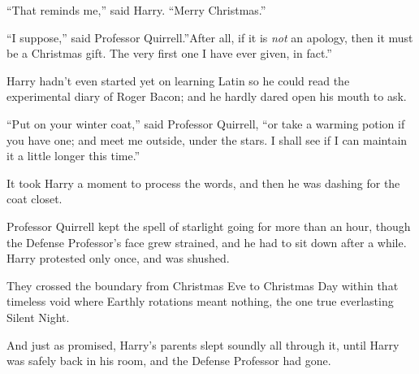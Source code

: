 ``That reminds me,'' said Harry. ``Merry Christmas.''

``I suppose,'' said Professor Quirrell.''After all, if it is \emph{not}
an apology, then it must be a Christmas gift. The very first one I have
ever given, in fact.''

Harry hadn't even started yet on learning Latin so he could read the
experimental diary of Roger Bacon; and he hardly dared open his mouth to
ask.

``Put on your winter coat,'' said Professor Quirrell, ``or take a
warming potion if you have one; and meet me outside, under the stars. I
shall see if I can maintain it a little longer this time.''

It took Harry a moment to process the words, and then he was dashing for
the coat closet.

Professor Quirrell kept the spell of starlight going for more than an
hour, though the Defense Professor's face grew strained, and he had to
sit down after a while. Harry protested only once, and was shushed.

They crossed the boundary from Christmas Eve to Christmas Day within
that timeless void where Earthly rotations meant nothing, the one true
everlasting Silent Night.

And just as promised, Harry's parents slept soundly all through it,
until Harry was safely back in his room, and the Defense Professor had
gone.

